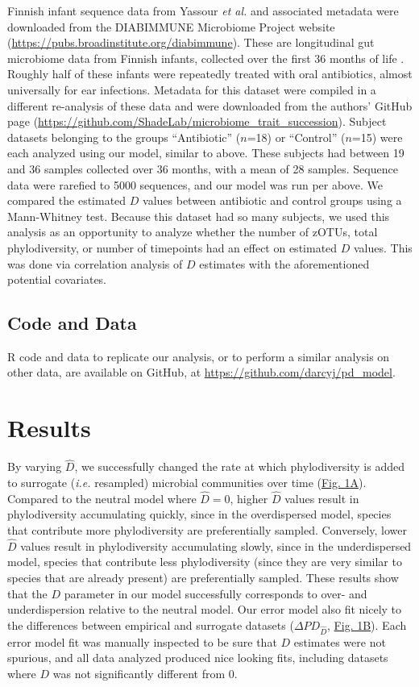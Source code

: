 \documentclass{article}
\begin{document}
\par
Finnish infant sequence data from Yassour \emph{et al.} \cite{Yassour2016} and associated metadata were downloaded from the DIABIMMUNE Microbiome Project website (\url{https://pubs.broadinstitute.org/diabimmune}). These are longitudinal gut microbiome data from Finnish infants, collected over the first 36 months of life \cite{Yassour2016}. Roughly half of these infants were repeatedly treated with oral antibiotics, almost universally for ear infections. Metadata for this dataset were compiled in a different re-analysis of these data \cite{Guittar2019} and were downloaded from the authors’ GitHub page (\url{https://github.com/ShadeLab/microbiome_trait_succession}). Subject datasets belonging to the groups “Antibiotic” (\(n\)=18) or “Control” (\(n\)=15) were each analyzed using our model, similar to above. These subjects had between 19 and 36 samples collected over 36 months, with a mean of 28 samples. Sequence data were rarefied to 5000 sequences, and our model was run per above. We compared the estimated \(D\) values between antibiotic and control groups using a Mann-Whitney test. Because this dataset had so many subjects, we used this analysis as an opportunity to analyze whether the number of zOTUs, total phylodiversity, or number of timepoints had an effect on estimated \(D\) values. This was done via correlation analysis of \(D\) estimates with the aforementioned potential covariates.

\subsection{Code and Data} \label{sec:codeAndData}
R code and data to replicate our analysis, or to perform a similar analysis on other data, are available on GitHub, at \url{https://github.com/darcyj/pd_model}. 


\section{Results} \label{sec:results}
By varying \(\hat{D}\), we successfully changed the rate at which phylodiversity is added to surrogate (\emph{i.e.} resampled) microbial communities over time (\hyperref[sec:figure1]{Fig. 1A}). Compared to the neutral model where \(\hat{D} = 0\), higher \(\hat{D}\) values result in phylodiversity accumulating quickly, since in the overdispersed model, species that contribute more phylodiversity are preferentially sampled. Conversely, lower \(\hat{D}\) values result in phylodiversity accumulating slowly, since in the underdispersed model, species that contribute less phylodiversity (since they are very similar to species that are already present) are preferentially sampled. These results show that the \(D\) parameter in our model successfully corresponds to over- and underdispersion relative to the neutral model. Our error model also fit nicely to the differences between empirical and surrogate datasets (\(\Delta PD_{\hat{D}}\), \hyperref[sec:figure1]{Fig. 1B}). Each error model fit was manually inspected to be sure that \(D\) estimates were not spurious, and all data analyzed produced nice looking fits, including datasets where \(D\) was not significantly different from 0. 
\end{document}
